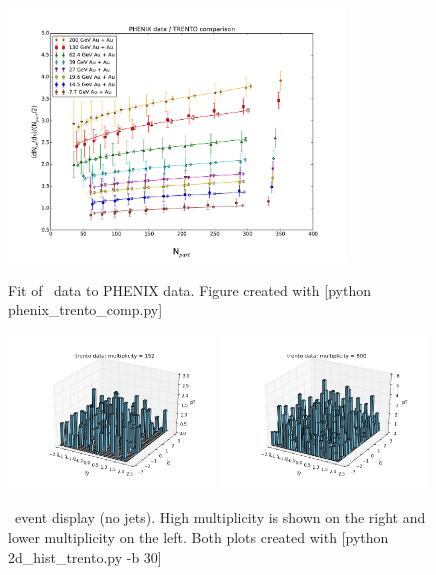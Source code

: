 \documentclass[11pt]{article}
\begin{document}
\begin{figure}[h]
\begin{center}
\includegraphics[width=0.8\textwidth]{phenix_trento_comp.pdf}
\label{fig_label}
\caption{Fit of \trento\ data to PHENIX data. Figure created with [python phenix\_trento\_comp.py]}
\end{center}
\end{figure}

\begin{figure}[h]
\begin{center}
\includegraphics[width=0.49\textwidth]{2d_hist_trento.png}
\includegraphics[width=0.49\textwidth]{2d_hist_trento2.png}
\label{fig_label}
\caption{\trento\ event display (no jets). High multiplicity is shown on the right and lower multiplicity on the left. Both plots created with [python 2d\_hist\_trento.py -b 30]}
\end{center}
\end{figure}
\end{document}
